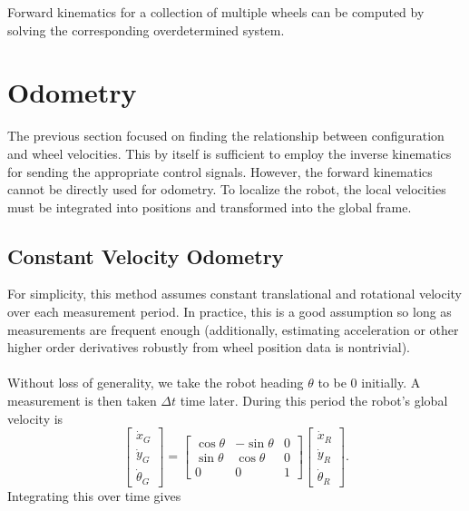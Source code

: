 \documentclass{article}
\begin{document}
Forward kinematics for a collection of multiple wheels can be computed by solving the corresponding overdetermined system.

\section{Odometry}
The previous section focused on finding the relationship between configuration and wheel velocities. This by itself is sufficient to employ the inverse kinematics for sending the appropriate control signals. However, the forward kinematics cannot be directly used for odometry. To localize the robot, the local velocities must be integrated into positions and transformed into the global frame.

\subsection{Constant Velocity Odometry}
For simplicity, this method assumes constant translational and rotational velocity over each measurement period. In practice, this is a good assumption so long as measurements are frequent enough (additionally, estimating acceleration or other higher order derivatives robustly from wheel position data is nontrivial).\\
\\
Without loss of generality, we take the robot heading $\theta$ to be $0$ initially. A measurement is then taken $\Delta t$ time later. During this period the robot's global velocity is
$$
\begin{bmatrix}
    \dot{x}_G \\
    \dot{y}_G \\
    \dot{\theta}_G
\end{bmatrix}
=
\begin{bmatrix}
    \operatorname{cos} \theta & -\operatorname{sin} \theta & 0 \\
    \operatorname{sin} \theta & \operatorname{cos} \theta & 0 \\
    0 & 0 & 1
\end{bmatrix}
\begin{bmatrix}
    \dot{x}_R \\
    \dot{y}_R \\
    \dot{\theta}_R
\end{bmatrix}.
$$
Integrating this over time gives
\end{document}
